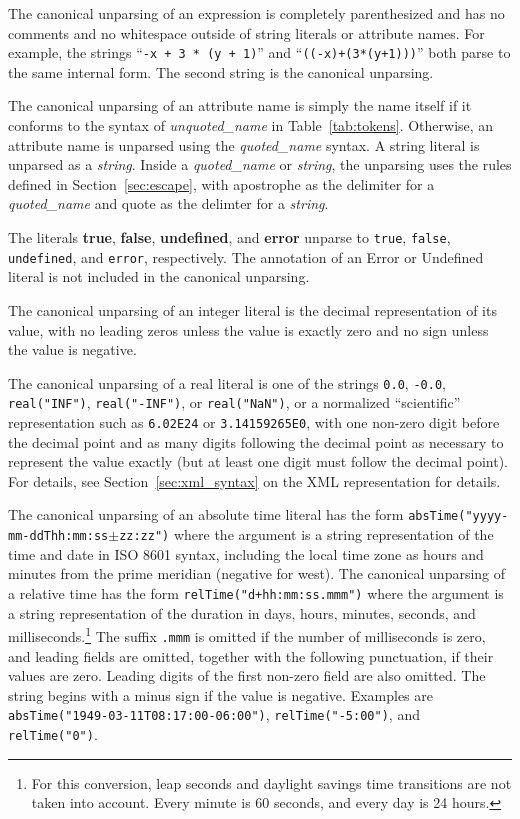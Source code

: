 \documentclass{article}
\begin{document}
The canonical unparsing of an expression is completely parenthesized and has no
comments and no whitespace outside of string literals
or attribute names.  For example, the strings ``\verb|-x + 3 * (y + 1)|'' and
``\verb|((-x)+(3*(y+1)))|'' both parse to the same internal form.
The second string is the canonical unparsing.

The canonical unparsing of an attribute name is simply the name itself if it
conforms to the syntax of \emph{unquoted\_name} in Table~\ref{tab:tokens}.
Otherwise, an attribute name is unparsed using the \emph{quoted\_name} syntax.
A string literal is unparsed as a \emph{string}.
Inside a \emph{quoted\_name} or \emph{string}, the unparsing uses the rules
defined in Section~\ref{sec:escape}, with apostrophe as the delimiter for a
\emph{quoted\_name} and quote as the delimter for a \emph{string}.

The literals
\textbf{true},
\textbf{false},
\textbf{undefined}, and
\textbf{error}
unparse to
\texttt{true},
\texttt{false},
\texttt{undefined}, and
\texttt{error},
respectively.  The annotation of an Error or Undefined literal is not
included in the canonical unparsing.

The canonical unparsing of an integer literal is the decimal representation of
its value, with no leading zeros unless the value is exactly zero and no sign
unless the value is negative.

The canonical unparsing of a real literal is one of the strings
\verb/0.0/, \verb/-0.0/, \verb/real("INF")/, \verb/real("-INF")/, or
\verb/real("NaN")/, or a normalized ``scientific'' representation such as
\verb/6.02E24/ or \verb/3.14159265E0/, with one non-zero digit before the
decimal point and as many digits following the decimal point as necessary
to represent the value exactly (but at least one digit must follow the decimal
point).
For details, see Section~\ref{sec:xml_syntax} on the XML representation for
details.

The canonical unparsing of an absolute time literal has the form
\texttt{absTime("yyyy-mm-ddThh:mm:ss$\pm$zz:zz")} where the argument is a string
representation of the time and date in ISO 8601 syntax, including the local
time zone as hours and minutes from the prime
meridian (negative for west).
The canonical unparsing of a relative time has the form
\texttt{relTime("d+hh:mm:ss.mmm")} where the argument is a string representation
of the duration in days, hours, minutes, seconds, and
milliseconds.\footnote{For this conversion, leap seconds and daylight savings
time transitions are not taken into account.  Every minute is 60
seconds, and every day is 24 hours.}
The suffix \texttt{.mmm} is omitted if the number of milliseconds is zero,
and leading fields are omitted, together with the following punctuation, if
their values are zero.  Leading digits of the first non-zero field are also
omitted.  The string begins with a minus sign if the value
is negative.  Examples are \texttt{absTime("1949-03-11T08:17:00-06:00")},
\texttt{relTime("-5:00")}, and \texttt{relTime("0")}.
\end{document}

